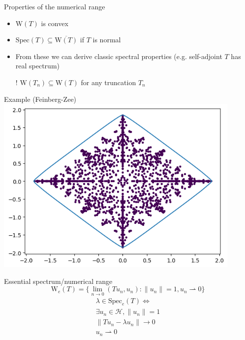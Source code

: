 \documentclass[14pt]{beamer}
\newcommand{\Spec}{\mathrm{Spec}} %
\newcommand{\Num}{\mathrm{W}} %
\newcommand{\1}{\mathbf{1}}
\begin{document}
\begin{frame}{Properties of the numerical range}
  \begin{itemize}
    \item $\Num(T)$ is convex 
    \item $\Spec(T) \subseteq \overline{\Num(T)}$ if $T$ is normal
    \item From these we can derive classic spectral properties (e.g. self-adjoint $T$ has real spectrum)
    \item[!] $\Num(T_n) \subseteq \Num(T)$ for any truncation $T_n$
  \end{itemize}
\end{frame}

\begin{frame}{Example (Feinberg-Zee)}
  \includegraphics[width=0.9\textwidth]{feinberg-zee-num-range}
\end{frame}

\begin{frame}{Essential spectrum/numerical range}
  \centering
  $$\Num_e(T) = \{\lim_{n \rightarrow 0}(Tu_n, u_n) : \|u_n\| = 1, u_n \rightharpoonup 0\}$$
  \begin{align*}
    \lambda \in \Spec_e(T) \Leftrightarrow \\
    \exists u_n \in \mathcal{H}, \|u_n\|=1 \\
    \|Tu_n - \lambda u_n\| \rightarrow 0 \\
    u_n \rightharpoonup 0
  \end{align*}
\end{frame}
\end{document}

